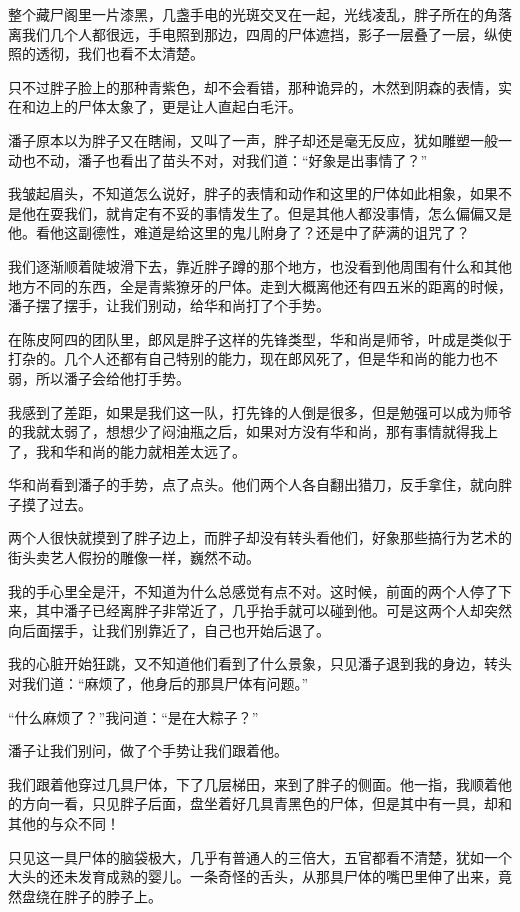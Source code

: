 整个藏尸阁里一片漆黑，几盏手电的光斑交叉在一起，光线凌乱，胖子所在的角落离我们几个人都很远，手电照到那边，四周的尸体遮挡，影子一层叠了一层，纵使照的透彻，我们也看不太清楚。

只不过胖子脸上的那种青紫色，却不会看错，那种诡异的，木然到阴森的表情，实在和边上的尸体太象了，更是让人直起白毛汗。

潘子原本以为胖子又在瞎闹，又叫了一声，胖子却还是毫无反应，犹如雕塑一般一动也不动，潘子也看出了苗头不对，对我们道：“好象是出事情了？”

我皱起眉头，不知道怎么说好，胖子的表情和动作和这里的尸体如此相象，如果不是他在耍我们，就肯定有不妥的事情发生了。但是其他人都没事情，怎么偏偏又是他。看他这副德性，难道是给这里的鬼儿附身了？还是中了萨满的诅咒了？

我们逐渐顺着陡坡滑下去，靠近胖子蹲的那个地方，也没看到他周围有什么和其他地方不同的东西，全是青紫獠牙的尸体。走到大概离他还有四五米的距离的时候，潘子摆了摆手，让我们别动，给华和尚打了个手势。

在陈皮阿四的团队里，郎风是胖子这样的先锋类型，华和尚是师爷，叶成是类似于打杂的。几个人还都有自己特别的能力，现在郎风死了，但是华和尚的能力也不弱，所以潘子会给他打手势。

我感到了差距，如果是我们这一队，打先锋的人倒是很多，但是勉强可以成为师爷的我就太弱了，想想少了闷油瓶之后，如果对方没有华和尚，那有事情就得我上了，我和华和尚的能力就相差太远了。

华和尚看到潘子的手势，点了点头。他们两个人各自翻出猎刀，反手拿住，就向胖子摸了过去。

两个人很快就摸到了胖子边上，而胖子却没有转头看他们，好象那些搞行为艺术的街头卖艺人假扮的雕像一样，巍然不动。

我的手心里全是汗，不知道为什么总感觉有点不对。这时候，前面的两个人停了下来，其中潘子已经离胖子非常近了，几乎抬手就可以碰到他。可是这两个人却突然向后面摆手，让我们别靠近了，自己也开始后退了。

我的心脏开始狂跳，又不知道他们看到了什么景象，只见潘子退到我的身边，转头对我们道：“麻烦了，他身后的那具尸体有问题。”

“什么麻烦了？”我问道：“是在大粽子？”

潘子让我们别问，做了个手势让我们跟着他。

我们跟着他穿过几具尸体，下了几层梯田，来到了胖子的侧面。他一指，我顺着他的方向一看，只见胖子后面，盘坐着好几具青黑色的尸体，但是其中有一具，却和其他的与众不同！

只见这一具尸体的脑袋极大，几乎有普通人的三倍大，五官都看不清楚，犹如一个大头的还未发育成熟的婴儿。一条奇怪的舌头，从那具尸体的嘴巴里伸了出来，竟然盘绕在胖子的脖子上。

